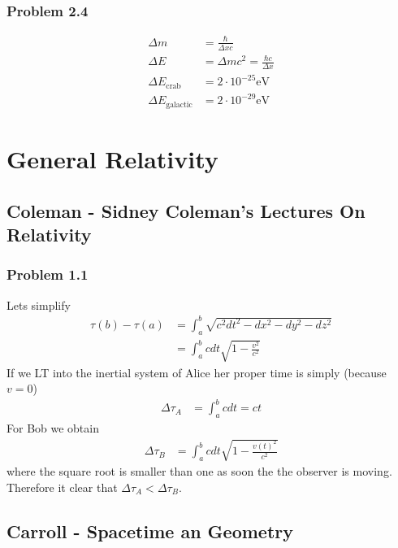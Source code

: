 \documentclass[10pt,a4paper]{article}
\theoremstyle{definition}
\begin{document}
\subsubsection{Problem 2.4}
\begin{align}
\Delta m &= \frac{\hbar}{\Delta x c}\\
\Delta E &= \Delta m c^2=\frac{\hbar c}{\Delta x}\\
\Delta E_\text{crab}&=2\cdot10^{-25}\text{eV}\\
\Delta E_\text{galactic}&=2\cdot10^{-29}\text{eV}
\end{align}

\newpage
\section{General Relativity}

\subsection{{\sc Coleman} - Sidney Coleman’s Lectures On Relativity}
\subsubsection{Problem 1.1}
Lets simplify
\begin{align}
\tau(b)-\tau(a)&=\int_a^b\sqrt{c^2dt^2-dx^2-dy^2-dz^2}\\
&=\int_a^bcdt\sqrt{1-\frac{v^2}{c^2}}
\end{align}
If we LT into the inertial system of Alice her proper time is simply (because $v=0$)
\begin{align}
\Delta\tau_A&=\int_a^bcdt=ct
\end{align}
For Bob we obtain
\begin{align}
\Delta\tau_B&=\int_a^bcdt\sqrt{1-\frac{v(t)^2}{c^2}}
\end{align}
where the square root is smaller than one as soon the the observer is moving. Therefore it clear that $\Delta\tau_A<\Delta\tau_B$.


\subsection{{\sc Carroll} - Spacetime an Geometry}
\end{document}
